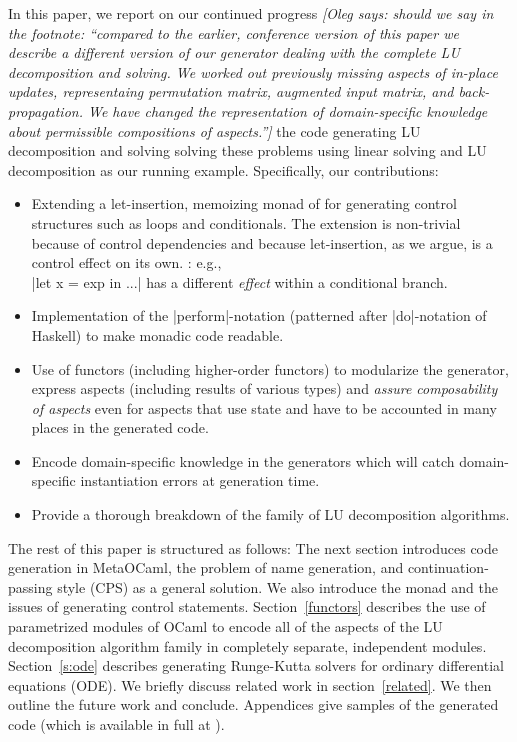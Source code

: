 \documentclass[draft]{elsart}
\newcommand{\oleg}[1]{{\it [Oleg says: #1]}}
\begin{document}
In this paper, we report on our continued progress \cite{CaretteKiselyov05}
\oleg{should we say in the footnote: ``compared to the earlier,
  conference version of this paper we describe a different
  version of our generator dealing with the complete LU decomposition
  and solving. We worked out previously missing aspects of in-place
  updates, representaing permutation matrix, augmented input matrix,
  and back-propagation. We have changed the representation of
  domain-specific knowledge about permissible compositions of aspects.''}
the code generating LU decomposition and solving 
solving these problems using linear solving and LU decomposition
as our running example. Specifically, our contributions:
\begin{itemize}
    \item Extending a let-insertion, memoizing monad of
      \cite{MSP:PADL04,KiselyovTaha} for generating control structures
      such as loops and conditionals. The extension is non-trivial
      because of control dependencies and because
      let-insertion, as we argue, is a control effect on its own.
      : e.g.,\\
      |let x = exp in ...| has a different \emph{effect} within a
      conditional branch.
    \item Implementation of the |perform|-notation (patterned after
      |do|-notation of Haskell) to make monadic code readable.
    \item Use of functors (including higher-order functors) to
      modularize the generator, express aspects (including results of
      various types) and \emph{assure composability of aspects} even
      for aspects that use state and have to be accounted in many
      places in the generated code.
    \item Encode domain-specific knowledge in the generators which 
      will catch domain-specific instantiation errors at generation
      time.
    \item Provide a thorough breakdown of the family of LU decomposition
      algorithms.
\end{itemize}

The rest of this paper is structured as follows: The next section
introduces code generation in MetaOCaml, the problem of name
generation, and continuation-passing style (CPS) as a general
solution.  We also introduce the monad and the issues of generating
control statements. Section~\ref{functors} describes the use of
parametrized modules of OCaml to encode all of the aspects of the
LU decomposition algorithm family in completely separate,
independent modules.  Section~\ref{s:ode} describes generating
Runge-Kutta solvers for ordinary differential equations (ODE).
We briefly discuss related work in
section~\ref{related}. We then outline the future work and conclude.
Appendices give samples of the generated code (which is available in
full at \cite{metamonadsURL}).
\end{document}

